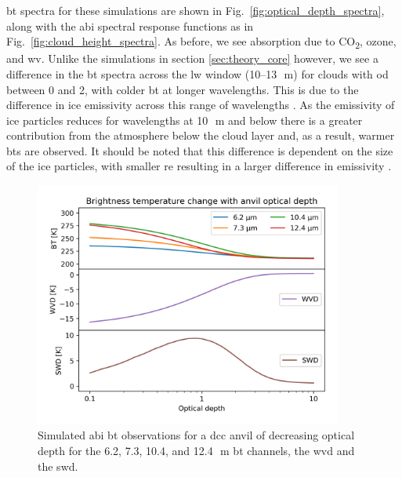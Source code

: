 \acrshort{bt} spectra for these simulations are shown in Fig.~\ref{fig:optical_depth_spectra}, along with the \acrshort{abi} spectral response functions as in Fig.~\ref{fig:cloud_height_spectra}.
As before, we see absorption due to CO\textsubscript{2}, ozone, and \acrshort{wv}.
Unlike the simulations in section \ref{sec:theory_core} however, we see a difference in the \acrshort{bt} spectra across the \acrshort{lw} window (10--13\,\unit{\mu m}) for clouds with \acrshort{od} between 0 and 2, with colder \acrshort{bt} at longer wavelengths.
This is due to the difference in ice emissivity across this range of wavelengths \citep{fu_radiation_2015}.
As the emissivity of ice particles reduces for wavelengths at 10\,\unit{\mu m} and below there is a greater contribution from the atmosphere below the cloud layer and, as a result, warmer \acrshort{bt}s are observed.
It should be noted that this difference is dependent on the size of the ice particles, with smaller \acrshort{re} resulting in a larger difference in emissivity \citep{dubuisson_sensitivity_2008}.


\begin{figure}[tp]
    \includegraphics[width=0.9\textwidth]{figures/chapter1_09.png}
    \caption[
    Simulated \acrshort{abi} \acrshort{bt} observations for a \acrshort{dcc} anvil of decreasing optical depth
    ]{
    Simulated \acrshort{abi} \acrshort{bt} observations for a \acrshort{dcc} anvil of decreasing optical depth for the 6.2, 7.3, 10.4, and 12.4\,\unit{\mu m} \acrshort{bt} channels, the \acrshort{wvd} and the \acrshort{swd}.
    }
    \label{fig:optical_depth_channels}
\end{figure}

